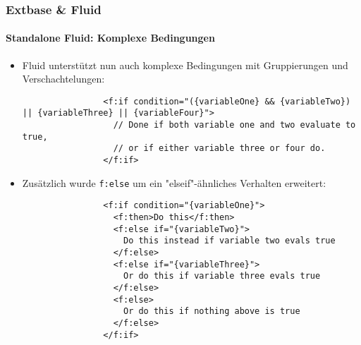\begin{frame}[fragile]
	\frametitle{Extbase \& Fluid}
	\framesubtitle{Standalone Fluid: Komplexe Bedingungen}

	\lstset{basicstyle=\tiny\ttfamily}

	\begin{itemize}

		\item Fluid unterstützt nun auch komplexe Bedingungen mit Gruppierungen und Verschachtelungen:

			\begin{lstlisting}
				<f:if condition="({variableOne} && {variableTwo}) || {variableThree} || {variableFour}">
				  // Done if both variable one and two evaluate to true,
				  // or if either variable three or four do.
				</f:if>
			\end{lstlisting}

		\item Zusätzlich wurde \texttt{f:else} um ein "elseif"-ähnliches Verhalten erweitert:

			\begin{lstlisting}
				<f:if condition="{variableOne}">
				  <f:then>Do this</f:then>
				  <f:else if="{variableTwo}">
				    Do this instead if variable two evals true
				  </f:else>
				  <f:else if="{variableThree}">
				    Or do this if variable three evals true
				  </f:else>
				  <f:else>
				    Or do this if nothing above is true
				  </f:else>
				</f:if>
			\end{lstlisting}

	\end{itemize}

\end{frame}



